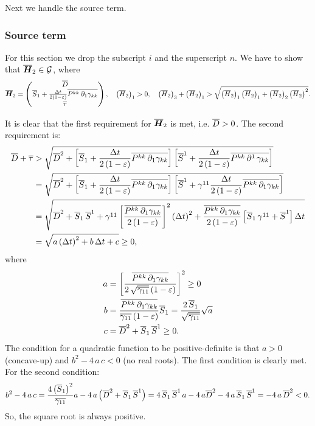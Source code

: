 \documentclass[10pt,preprint]{aastex}
\begin{document}
Next we handle the source term.

\subsubsection{Source term}
For this section we drop the subscript $i$ and the superscript $n$. We have to show that $\ol{\bH}_{2}\in\cG$, where
\begin{equation}
    \ol{\bH}_{2}=\begin{pmatrix}\ol{D}\\ \ol{S}_{1}+\f{\Delta t}{2\left(1-\ve\right)}\ol{P^{kk}\,\pd{\gamma_{kk}}{1}} \\ \ol{\tau}\end{pmatrix},\hspace{1em}\left(\ol{H}_{2}\right)_{1}>0,\hspace{1em}\left(\ol{H}_{2}\right)_{3}+\left(\ol{H}_{2}\right)_{1}>\sqrt{\left(\ol{H}_{2}\right)_{1}\left(\ol{H}_{2}\right)_{1}+\left(\ol{H}_{2}\right)_{2}\left(\ol{H}_{2}\right)^{2}}.
\end{equation}

It is clear that the first requirement for $\ol{\bH}_{2}$ is met, i.e. $\ol{D}>0$. The second requirement is:
\begin{align}
    \ol{D}+\ol{\tau}&>\sqrt{\ol{D}^{2}+\left[\ol{S}_{1}+\f{\Delta t}{2\left(1-\ve\right)}\ol{P^{kk}\,\pd{\gamma_{kk}}{1}}\right] \left[\ol{S}^{1}+\f{\Delta t}{2\left(1-\ve\right)}\ol{P^{kk}\,\p^{1}\,\gamma_{kk}}\right] }\\
    &=\sqrt{\ol{D}^{2}+\left[\ol{S}_{1}+\f{\Delta t}{2\left(1-\ve\right)}\ol{P^{kk}\,\pd{\gamma_{kk}}{1}}\right] \left[\ol{S}^{1}+\gamma^{11}\f{\Delta t}{2\left(1-\ve\right)}\ol{P^{kk}\,\pd{\gamma_{kk}}{1}}\right] }\\
    &=\sqrt{\ol{D}^{2}+\ol{S}_{1}\,\ol{S}^{1}+\gamma^{11}\left[\f{\ol{P^{kk}\,\pd{\gamma_{kk}}{1}}}{2\left(1-\ve\right)}\right]^{2}\left(\Delta t\right)^{2}+\f{\ol{P^{kk}\,\pd{\gamma_{kk}}{1}}}{2\left(1-\ve\right)}\left[\ol{S}_{1}\,\gamma^{11}+\ol{S}^{1}\right]\Delta t}\\
    &=\sqrt{a\left(\Delta t\right)^{2}+b\,\Delta t+c}\geq0,
\end{align}
where
\begin{align}
    a&=\left[\f{\ol{P^{kk}\,\pd{\gamma_{kk}}{1}}}{2\,\sqrt{\ol{\gamma_{11}}}\left(1-\ve\right)}\right]^{2}\geq0\\
    b&=\f{\ol{P^{kk}\,\pd{\gamma_{kk}}{1}}}{\ol{\gamma_{11}}\left(1-\ve\right)}\ol{S}_{1}=\f{2\,\ol{S}_{1}}{\sqrt{\ol{\gamma_{11}}}}\sqrt{a}\\
    c&=\ol{D}^{2}+\ol{S}_{1}\,\ol{S}^{1}\geq0.
\end{align}
The condition for a quadratic function to be positive-definite is that $a>0$ (concave-up) and $b^{2}-4\,a\,c<0$ (no real roots). The first condition is clearly met. For the second condition:
\begin{equation}
    b^{2}-4\,a\,c=\f{4\left(\ol{S}_{1}\right)^{2}}{\ol{\gamma_{11}}}a-4\,a\left(\ol{D}^{2}+\ol{S}_{1}\,\ol{S}^{1}\right)=4\,\ol{S}_{1}\,\ol{S}^{1}\,a-4\,a\ol{D}^{2}-4\,a\,\ol{S}_{1}\,\ol{S}^{1}=-4\,a\,\ol{D}^{2}<0.
\end{equation}
So, the square root is always positive.
\end{document}

